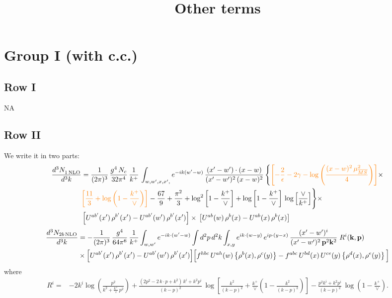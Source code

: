 \documentclass[9pt]{article}
\title{Other terms}
\author{}
\date{}
\numberwithin{equation}{section}
\begin{document}
\maketitle
\section{Group I (with c.c.)}
\subsection{Row I}
\textsc{NA}
\subsection{Row II}
We write it in two parts:
\begin{align}
     \frac{d^{3}N_{1\,\rm NLO}^{\rm}}{d^{3}k} &  =  \frac{1}{(2\pi)^{3}}\, \frac{g^{4}\,N_{c}}{32\pi^{4}}\,\frac{1}{k^{+}}\, \int_{w, w',x,x',} e^{-ik(w^\prime-w)}\, \frac{(x'-w')\cdot (x-w)}{(x'-w')^{2}\, (x-w)^{2}}\, \Bigg\{{\color{orange}\left[-\frac{2}{\epsilon}-2\gamma-\log{\left(\frac{(x-w)^{2}\,\mu^{2}_{\overline{MS}}}{4}\right)}\right]}\times \notag \\ & {\color{orange}\left[\frac{11}{3}+\log{\left(1-\frac{k^{+}}{\vee}\right)}\right]}-\frac{67}{9}+\frac{\pi^{2}}{3}+\log^{2}{\left[1-\frac{k^{+}}{\vee}\right]}+\log{\left[1-\frac{k^{+}}{\vee}\right]}\,\log{\left[\frac{\vee}{k^{+}}\right]}\Bigg\}\times\notag \\ & \left[U^{ab'}(x')\,\rho^{b'}(x') - U^{ab'}(w')\,\rho^{b'}(x')\right]\times\,\left[U^{ab}(w)\,\rho^{b}(x) - U^{ab}(x)\,\rho^{b}(x)\right]
\end{align}
\begin{align}
\frac{d^{3}N_{2b\,\rm NLO}}{d^{3}k} & = -\frac{1}{(2\pi)^{3}}\,\frac{g^{4}}{64\pi^{6}}\,\frac{1}{k^{+}}\int_{w,w'} e^{-ik\cdot(w'-w)}
\int d^{2}p\,d^{2}k\int_{x,y} e^{ik\cdot(w-y)}\,e^{ip\cdot(y-x)}\,\frac{(x'-w')^{i}}{(x'-w')^{2}\,\mathbf{p}^{2}\mathbf{k}^{2}}\;R^{i}(\mathbf{k},\mathbf{p})\notag\\
&\times\Big[U^{ab'}(x')\,\rho^{b'}(x')-U^{ab'}(w')\,\rho^{b'}(x')\Big]
\Big[f^{hbc}\,U^{ah}(w)\left\{\rho^{b}(x),\rho^{c}(y)\right\}-f^{abc}\,U^{bd}(x)\,U^{ce}(y)\left\{\rho^{d}(x),\rho^{e}(y)\right\}\Big]
\end{align}
where
\begin{align}
R^{i} =& -2k^{i}\log\left(\frac{p^{2}}{k^{2}+\frac{k^{+}}{\vee}\,p^{2}}\right)
+\frac{(2p^{2}-2\,k\cdot p+k^{2})\,k^{i}+k^{2}p^{i}}{(k-p)^{2}}\,
\log\left[\frac{k^{2}}{(k-p)^{2}}+\frac{k^{+}}{\vee}\left(1-\frac{k^{2}}{(k-p)^{2}}\right)\right]
-\frac{p^{2}k^{i}+k^{2}p^{i}}{(k-p)^{2}}\,\log\left(1-\frac{k^{+}}{\vee}\right).
\end{align}
\end{document}
